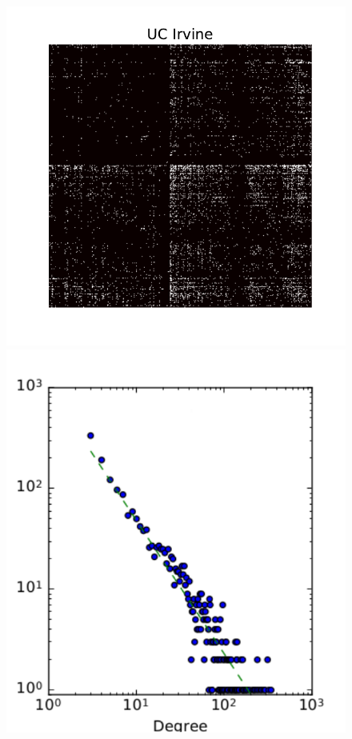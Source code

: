 \begin{figure}[h]
	\centering
	
	
	\includegraphics[scale=0.4]{img/irvine}
	\endminipage
	\includegraphics[scale=0.4]{img/irvine_d}

\end{figure}
